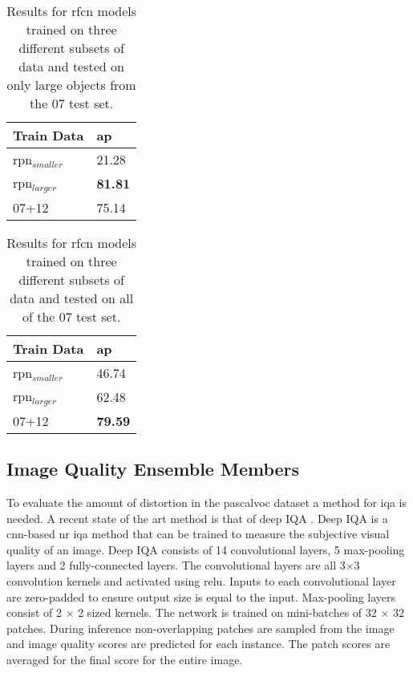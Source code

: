 \documentclass[a4paper,twoside]{article}
\begin{document}
\begin{table}[h]
\centering
\caption{Results for \gls{rfcn} models trained on three different subsets of data and tested on only large objects from the 07 test set.}
\label{tab:large07res}
\begin{tabular}{|l|l|}
\hline
\textbf{Train Data} & \textbf{\gls{ap}}      \\ \hline
\gls{rpn}$_{smaller}$      & 21.28 \\ \hline
\gls{rpn}$_{larger}$      & \textbf{81.81} \\ \hline
07+12        & 75.14 \\ \hline
\end{tabular}
\end{table}

\begin{table}[h]
\centering
\caption{Results for \gls{rfcn} models trained on three different subsets of data and tested on all of the 07 test set.}
\label{tab:alldatares}
\begin{tabular}{|l|l|}
\hline
\textbf{Train Data} & \textbf{\gls{ap}}      \\ \hline
\gls{rpn}$_{smaller}$      & 46.74 \\ \hline
\gls{rpn}$_{larger}$      & 62.48 \\ \hline
07+12        & \textbf{79.59} \\ \hline
\end{tabular}
\end{table}

\subsection{Image Quality Ensemble Members}
To evaluate the amount of distortion in the \gls{pascalvoc} dataset a method for \gls{iqa} is needed. A recent state of the art method is that of deep IQA \cite{deepiqa}. Deep IQA is a \gls{cnn}-based \gls{nr} \gls{iqa} method that can be trained to measure the subjective visual quality of an image. Deep IQA consists of 14 convolutional layers, 5 max-pooling layers and 2 fully-connected layers. The convolutional layers are all 3$\times$3 convolution kernels and activated using \gls{relu}. Inputs to each convolutional layer are zero-padded to ensure output size is equal to the input. Max-pooling layers consist of 2 $\times$ 2 sized kernels. The network is trained on mini-batches of 32 $\times$ 32 patches. During inference non-overlapping patches are sampled from the image and image quality scores are predicted for each instance. The patch scores are averaged for the final score for the entire image. 
\end{document}
